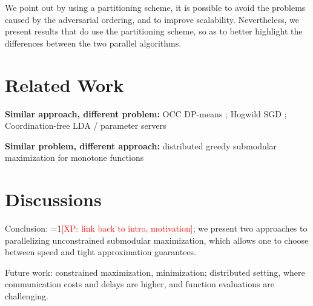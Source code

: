 \documentclass{article} %
\newcommand{\Comments}{1}
\newcommand{\note}[2]{\ifnum\Comments=1\textcolor{#1}{#2}\fi}
\newcommand{\xinghao}[1]{\note{red}{[XP: #1]}}
\begin{document}
We point out by using a partitioning scheme, it is possible to avoid the problems caused by the adversarial ordering, and to improve scalability.
Nevertheless, we present results that do use the partitioning scheme, so as to better highlight the differences between the two parallel algorithms.









\section{Related Work}
\textbf{Similar approach, different problem: } OCC DP-means \cite{pan2013}; Hogwild SGD \cite{Recht11}; Coordination-free LDA \cite{Ahmed12} / parameter servers \cite{li2013, ho2013}

\textbf{Similar problem, different approach: } distributed greedy submodular maximization for monotone functions \cite{Mirzasoleiman2013}






\section{Discussions}

Conclusion: \xinghao{link back to intro, motivation}; we present two approaches to parallelizing unconstrained submodular maximization, which allows one to choose between speed and tight approximation guarantees.

Future work: constrained maximization, minimization; distributed setting, where communication costs and delays are higher, and function evaluations are challenging.


{\footnotesize




}
\end{document}
